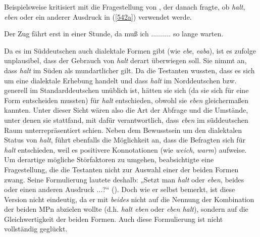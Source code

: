 Beispielsweise kritisiert \citet[16--17]{Elspass2005} mit \citet[174--178]{Hentschel1986} die Fragestellung von \citet{Eichhoff1978}, der danach fragte, ob \textit{halt}, \textit{eben} oder ein anderer Ausdruck in (\ref{542a}) verwendet werde.

\begin{exe}
	\ex\label{542a} 
 Der Zug fährt erst in einer Stunde, da muß ich .......... so lange warten.
\end{exe}																
Da es im Süddeutschen auch dialektale Formen gibt (wie \textit{ebe}, \textit{eaba}), ist es \citet[174]{Hentschel1986} zufolge unplausibel, dass der Gebrauch von \textit{halt} derart überwiegen soll. Sie nimmt an, dass \textit{halt} im Süden als mundartlicher gilt. Da die Testanten wussten, dass es sich um eine dialektale Erhebung handelt und dass \textit{halt} im Norddeutschen bzw. generell im Standarddeutschen unüblich ist, hätten sie sich (da sie sich für eine Form entscheiden mussten) für \textit{halt} entschieden, obwohl sie \textit{eben} gleichermaßen kannten. Unter dieser Sicht wären also die Art der Abfrage und die Umstände, unter denen sie stattfand, mit dafür verantwortlich, dass \textit{eben} im süddeutschen Raum unterrepräsentiert schien. Neben dem Bewusstsein um den dialektalen Status von \textit{halt}, führt \citet[176]{Hentschel1986} ebenfalls die Möglichkeit an, dass die Befragten sich für \textit{halt} entschieden, weil es positivere Konnotationen (wie \textit{weich}, \textit{warm}) aufweise. Um derartige mögliche Störfaktoren zu umgehen, beabsichtigte \citet{Elspass2005} eine Fragestellung, die die Testanten nicht zur Auswahl einer der beiden Formen zwang. Seine Formulierung lautete deshalb: „Setzt man \textit{halt} oder \textit{eben}, beides oder einen anderen Ausdruck ...?“  (\citealt[17, Fn 41]{Elspass2005}). Doch wie er selbst bemerkt, ist diese Version nicht eindeutig, da er mit \textit{beides} nicht auf die Nennung der Kombination der beiden MPn abzielen wollte (d.h. \textit{halt eben} oder \textit{eben halt}), sondern auf die Gleichwertigkeit der beiden Formen. Auch diese Formulierung ist nicht vollständig geglückt.

